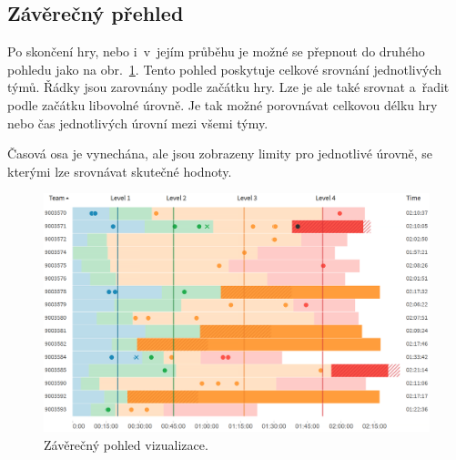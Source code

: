 \documentclass[
  digital, %
  oneside, %
  table,   %
  nolof,     %
  nolot,     %
]{fithesis3}
\begin{document}
\subsection{Závěrečný přehled}
Po skončení hry, nebo i~v~jejím průběhu je možné se přepnout do druhého pohledu jako na obr.~\ref{fig:visualizationChartFinal}. Tento pohled poskytuje celkové srovnání jednotlivých týmů. Řádky jsou zarovnány podle začátku hry. Lze je ale také srovnat a~řadit podle začátku libovolné úrovně. Je tak možné porovnávat celkovou délku hry nebo čas jednotlivých úrovní mezi všemi týmy.\par
Časová osa je vynechána, ale jsou zobrazeny limity pro jednotlivé úrovně, se kterými lze srovnávat skutečné hodnoty.
\begin{figure}[H]
  \begin{center}
    \includegraphics[width=12.7cm]{images/vizualizace-final.png}
  \end{center}
  \caption{Závěrečný pohled vizualizace.}
  \label{fig:visualizationChartFinal}
\end{figure}
\end{document}
